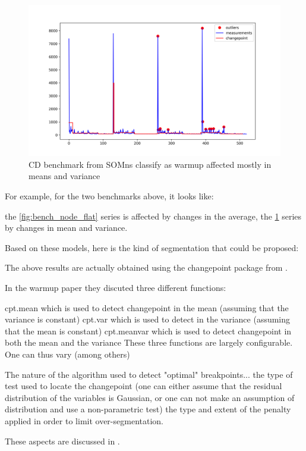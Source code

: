 \documentclass{article}
\begin{document}
\begin{figure}[h!]
    \centering
    \includegraphics[width=1\textwidth]{images/plot_10_flat.png}
    \caption{CD benchmark from SOMns classify as warmup affected mostly in means and variance}
    \label{fig:bench_somns_flat}
\end{figure}

For example, for the two benchmarks above, it looks like:

the \ref{fig:bench_node_flat} series is affected by changes in the average,
the \ref{fig:bench_somns_flat} series by changes in mean and variance.


Based on these models, here is the kind of segmentation that could be proposed:

The above results are actually obtained using the changepoint package from \cite{killick2014changepoint}.

In the warmup paper they discuted three different functions:

cpt.mean which is used to detect changepoint in the mean (assuming that the variance is constant)
cpt.var which is used to detect  in the variance (assuming that the mean is constant)
cpt.meanvar which is used to detect changepoint in both the mean and the variance
These three functions are largely configurable. One can thus vary (among others)

The nature of the algorithm used to detect "optimal" breakpoints...
the type of test used to locate the changepoint (one can either assume that the residual distribution of the variables is Gaussian, or one can not make an assumption of distribution and use a non-parametric test)
the type and extent of the penalty applied in order to limit over-segmentation.

These aspects are discussed in \cite{killick2014changepoint}.
\end{document}
